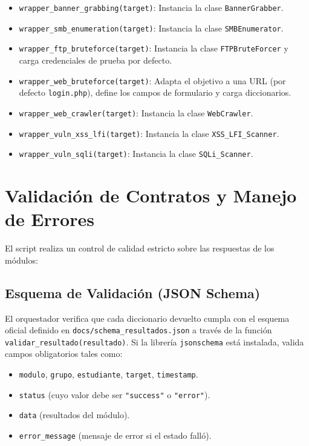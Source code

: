 \documentclass[12pt,a4paper]{article}
\begin{document}
\begin{itemize}
    \item \texttt{wrapper\_banner\_grabbing(target)}: Instancia la clase \texttt{BannerGrabber}.
    \item \texttt{wrapper\_smb\_enumeration(target)}: Instancia la clase \texttt{SMBEnumerator}.
    \item \texttt{wrapper\_ftp\_bruteforce(target)}: Instancia la clase \texttt{FTPBruteForcer} y carga credenciales de prueba por defecto.
    \item \texttt{wrapper\_web\_bruteforce(target)}: Adapta el objetivo a una URL (por defecto \texttt{login.php}), define los campos de formulario y carga diccionarios.
    \item \texttt{wrapper\_web\_crawler(target)}: Instancia la clase \texttt{WebCrawler}.
    \item \texttt{wrapper\_vuln\_xss\_lfi(target)}: Instancia la clase \texttt{XSS\_LFI\_Scanner}.
    \item \texttt{wrapper\_vuln\_sqli(target)}: Instancia la clase \texttt{SQLi\_Scanner}.
\end{itemize}

\section{Validación de Contratos y Manejo de Errores}
El script realiza un control de calidad estricto sobre las respuestas de los módulos:

\subsection{Esquema de Validación (JSON Schema)}
El orquestador verifica que cada diccionario devuelto cumpla con el esquema oficial definido en \texttt{docs/schema\_resultados.json} a través de la función \texttt{validar\_resultado(resultado)}. Si la librería \texttt{jsonschema} está instalada, valida campos obligatorios tales como:
\begin{itemize}
    \item \texttt{modulo}, \texttt{grupo}, \texttt{estudiante}, \texttt{target}, \texttt{timestamp}.
    \item \texttt{status} (cuyo valor debe ser \texttt{"success"} o \texttt{"error"}).
    \item \texttt{data} (resultados del módulo).
    \item \texttt{error\_message} (mensaje de error si el estado falló).
\end{itemize}
\end{document}

